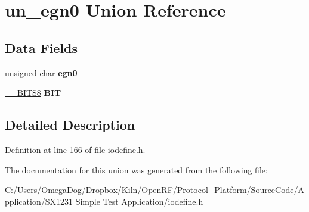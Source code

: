 \hypertarget{unionun__egn0}{\section{un\-\_\-egn0 Union Reference}
\label{unionun__egn0}
}
\subsection*{Data Fields}
\begin{DoxyCompactItemize}
\item 
\hypertarget{unionun__egn0_a81337354c903e3817b359ca7143bdd6d}{unsigned char {\bfseries egn0}}\label{unionun__egn0_a81337354c903e3817b359ca7143bdd6d}

\item 
\hypertarget{unionun__egn0_afdc25f655298352e3282e6bc9daf964f}{\hyperlink{struct_____b_i_t_s8}{\-\_\-\-\_\-\-B\-I\-T\-S8} {\bfseries B\-I\-T}}\label{unionun__egn0_afdc25f655298352e3282e6bc9daf964f}

\end{DoxyCompactItemize}


\subsection{Detailed Description}


Definition at line 166 of file iodefine.\-h.



The documentation for this union was generated from the following file\-:\begin{DoxyCompactItemize}
\item 
C\-:/\-Users/\-Omega\-Dog/\-Dropbox/\-Kiln/\-Open\-R\-F/\-Protocol\-\_\-\-Platform/\-Source\-Code/\-Application/\-S\-X1231 Simple Test Application/iodefine.\-h\end{DoxyCompactItemize}
